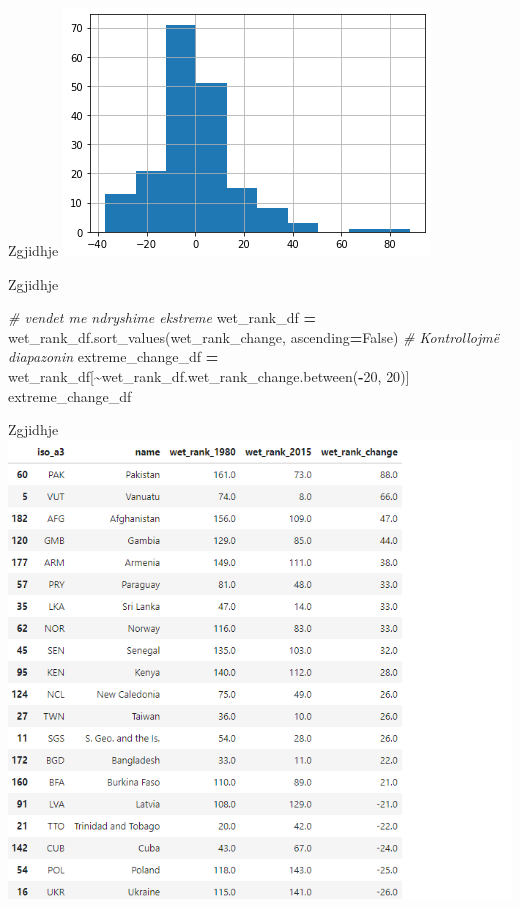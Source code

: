 \documentclass[
  ignorenonframetext,
]{beamer}
\newenvironment{Shaded}{\begin{snugshade}}{\end{snugshade}}
\newcommand{\CommentTok}[1]{\textcolor[rgb]{0.56,0.35,0.01}{\textit{#1}}}
\newcommand{\DecValTok}[1]{\textcolor[rgb]{0.00,0.00,0.81}{#1}}
\newcommand{\NormalTok}[1]{#1}
\newcommand{\OperatorTok}[1]{\textcolor[rgb]{0.81,0.36,0.00}{\textbf{#1}}}
\newcommand{\StringTok}[1]{\textcolor[rgb]{0.31,0.60,0.02}{#1}}
\newcommand{\VariableTok}[1]{\textcolor[rgb]{0.00,0.00,0.00}{#1}}
\begin{document}
\begin{frame}{Zgjidhje}
\protect\hypertarget{zgjidhje-15}{}
\includegraphics{./Figs/usht42.png}
\end{frame}

\begin{frame}[fragile]{Zgjidhje}
\protect\hypertarget{zgjidhje-16}{}

\begin{Shaded}
\begin{Highlighting}[]
\CommentTok{\# vendet me ndryshime ekstreme }
\NormalTok{wet\_rank\_df }\OperatorTok{=}\NormalTok{ wet\_rank\_df.sort\_values(}\StringTok{\textquotesingle{}wet\_rank\_change\textquotesingle{}}\NormalTok{, ascending}\OperatorTok{=}\VariableTok{False}\NormalTok{)}
\CommentTok{\# Kontrollojmë diapazonin}
\NormalTok{extreme\_change\_df }\OperatorTok{=}\NormalTok{ wet\_rank\_df[}\OperatorTok{\textasciitilde{}}\NormalTok{wet\_rank\_df.wet\_rank\_change.between(}\OperatorTok{{-}}\DecValTok{20}\NormalTok{, }\DecValTok{20}\NormalTok{)]}
\NormalTok{extreme\_change\_df}
\end{Highlighting}
\end{Shaded}
\end{frame}

\begin{frame}{Zgjidhje}
\protect\hypertarget{zgjidhje-17}{}
\includegraphics{./Figs/usht43.png}
\end{frame}
\end{document}
